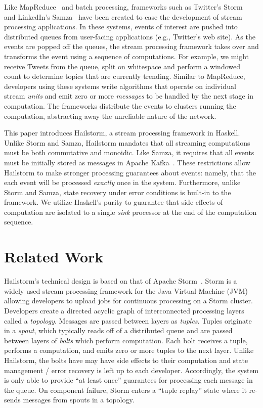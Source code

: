 \documentclass[10pt,nocopyrightspace]{sigplanconf}
\begin{document}
Like MapReduce~\cite{mapreduce} and batch processing, frameworks such as
Twitter's Storm~\cite{storm} and LinkedIn's Samza~\cite{samza} have been
created to ease the development of stream processing applications. In these
systems, events of interest are pushed into distributed queues from user-facing
applications (e.g., Twitter's web site).  As the events are popped off the
queues, the stream processing framework takes over and transforms the event
using a sequence of computations. For example, we might receive Tweets from the
queue, split on whitespace and perform a windowed count to determine topics
that are currently trending. Similar to MapReduce, developers using these
systems write algorithms that operate on individual stream \textit{units} and
emit zero or more \textit{messages} to be handled by the next stage in
computation. The frameworks distribute the events to clusters running the
computation, abstracting away the unreliable nature of the network.

This paper introduces Hailstorm, a stream processing framework in Haskell.
Unlike Storm and Samza, Hailstorm mandates that all streaming computations must
be both commutative and monoidic. Like Samza, it requires that all events must
be initially stored as messages in Apache Kafka~\cite{kafka}.  These
restrictions allow Hailstorm to make stronger processing guarantees about
events: namely, that the each event will be processed \textit{exactly} once in
the system. Furthermore, unlike Storm and Samza, state recovery under error
conditions is built-in to the framework. We utilize Haskell's purity to
guarantee that side-effects of computation are isolated to a single
\textit{sink} processor at the end of the computation sequence.


\section{Related Work}
Hailstorm's technical design is based on that of Apache Storm~\cite{storm}.
Storm is a widely used stream processing framework for
the Java Virtual Machine (JVM) allowing developers to upload jobs for continuous
processing on a Storm cluster. Developers create a directed acyclic graph of
interconnected processing layers called a \textit{topology}.
Messages are passed between layers as
\textit{tuples}. Tuples originate in a \textit{spout}, which typically reads
off of a distributed queue and are passed between layers of \textit{bolts} which
perform computation. Each bolt receives a tuple, performs a computation, and
emits zero or more tuples to the next layer. Unlike Hailstorm, the bolts have
may have side effects to their computation and state management / error recovery
is left up to each developer. Accordingly, the system is only able to provide
``at least once'' guarantees for processing each message in the queue. On
component failure, Storm enters a ``tuple replay'' state where it re-sends
messages from spouts in a topology.
\end{document}
